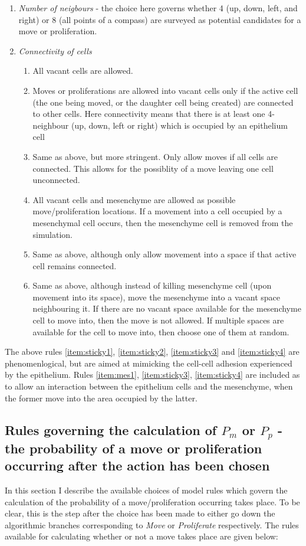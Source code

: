 \documentclass[pdftex,10pt,a4paper]{article}
\begin{document}
\begin{enumerate}
\item \textit{Number of neigbours} - the choice here governs whether 4 (up, down, left, and right) or 8 (all points of a compass) are surveyed as potential candidates for a move or proliferation.
\item \textit{Connectivity of cells}
\begin{enumerate}
\item All vacant cells are allowed.
\item Moves or proliferations are allowed into vacant cells only if the active cell (the one being moved, or the daughter cell being created) are connected to other cells. Here connectivity means that there is at least one 4-neighbour (up, down, left or right) which is occupied by an epithelium cell \label{item:sticky1}
\item Same as above, but more stringent. Only allow moves if all cells are connected. This allows for the possiblity of a move leaving one cell unconnected.\label{item:sticky2}
\item All vacant cells and mesenchyme are allowed as possible move/proliferation locations. If a movement into a cell occupied by a mesenchymal cell occurs, then the mesenchyme cell is removed from the simulation.\label{item:mes1}
\item Same as above, although only allow movement into a space if that active cell remains connected. \label{item:sticky3}
\item Same as above, although instead of killing mesenchyme cell (upon movement into its space), move the mesenchyme into a vacant space neighbouring it. If there are no vacant space available for the mesenchyme cell to move into, then the move is not allowed. If multiple spaces are available for the cell to move into, then choose one of them at random.\label{item:sticky4}
\end{enumerate}
\end{enumerate}

The above rules \ref{item:sticky1}, \ref{item:sticky2}, \ref{item:sticky3} and \ref{item:sticky4} are phenomenlogical, but are aimed at mimicking the cell-cell adhesion experienced by the epithelium. Rules \ref{item:mes1}, \ref{item:sticky3}, \ref{item:sticky4} are included as to allow an interaction between the epithelium cells and the mesenchyme, when the former move into the area occupied by the latter.

\subsection{Rules governing the calculation of $P_{m}$ or $P_p$ - the probability of a move or proliferation occurring after the action has been chosen}\label{sec:rule_pmove}
In this section I describe the available choices of model rules which govern the calculation of the probability of a move/proliferation occurring takes place. To be clear, this is the step after the choice has been made to either go down the algorithmic branches corresponding to \textit{Move} or \textit{Proliferate} respectively. The rules available for calculating whether or not a move takes place are given below:
\end{document}
